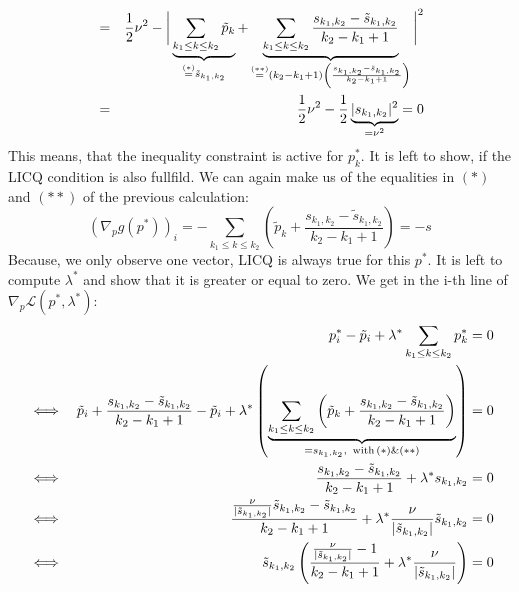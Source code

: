 \documentclass{scrreprt}
\newenvironment{proof}[1][Proof]{\begin{trivlist}
\item[\hskip \labelsep {\bfseries #1}]}{\end{trivlist}}
\begin{document}
\begin{proof}
\begin{eqnarray}
                    &=& \frac{1}{2} \nu^{2} - \bigg| \underbrace{\sum_{k_{1} \le k \le k_{2}} \tilde{p}_{k}}_{\overset{(\ast)}{=} \tilde{s}_{k_{1}, k_{2}}} + \underbrace{\sum_{k_{1} \le k \le k_{2}} \frac{s_{k_{1}, k_{2}} - \tilde{s}_{k_{1}, k_{2}}}{k_{2} - k_{1} + 1}}_{\overset{(\ast\ast)}{=} (k_{2} - k_{1} + 1) \left(\frac{s_{k_{1}, k_{2}} - \tilde{s}_{k_{1}, k_{2}}}{k_{2} - k_{1} + 1}\right)} \bigg|^{2} \notag \\
                    &=& \frac{1}{2} \nu^{2} - \frac{1}{2} \underbrace{|s_{k_{1}, k_{2}}|^{2}}_{= \nu^{2}} = 0 \notag
                \end{eqnarray}
            This means, that the inequality constraint is active for $p^{\ast}_{k}$. It is left to show, if the LICQ condition is also fullfild. We can again make us of the equalities in $(\ast)$ and $(\ast\ast)$ of the previous calculation:
                $$
                    (\nabla_{p} g(p^{\ast}))_{i} = - \sum_{k_{1} \le k \le k_{2}} \left( \tilde{p}_{k} + \frac{s_{k_{1}, k_{2}} - \tilde{s}_{k_{1}, k_{2}}}{k_{2} - k_{1} + 1} \right) = -s
                $$
            Because, we only observe one vector, LICQ is always true for this $p^{\ast}$. It is left to compute $\lambda^{\ast}$ and show that it is greater or equal to zero. We get in the i-th line of $\nabla_{p}\mathcal{L}(p^{\ast}, \lambda^{\ast})$:
                \begin{eqnarray}
                    &&p^{\ast}_{i} - \tilde{p}_{i} + \lambda^{\ast} \sum_{k_{1} \le k \le k_{2}} p^{\ast}_{k} = 0 \notag \\
                    &\iff& \tilde{p}_{i} + \frac{s_{k_{1}, k_{2}} - \tilde{s}_{k_{1}, k_{2}}}{k_{2} - k_{1} + 1} - \tilde{p}_{i} + \lambda^{\ast} \left( \underbrace{\sum_{k_{1} \le k \le k_{2}} \left( \tilde{p}_{k} + \frac{s_{k_{1}, k_{2}} - \tilde{s}_{k_{1}, k_{2}}}{k_{2} - k_{1} + 1} \right)}_{= s_{k_{1}, k_{2}}, \,\,\, \textnormal{with}\,(\ast) \& (\ast\ast)} \right) = 0 \notag \\
                    &\iff& \frac{s_{k_{1}, k_{2}} - \tilde{s}_{k_{1}, k_{2}}}{k_{2} - k_{1} + 1} + \lambda^{\ast}s_{k_{1}, k_{2}} = 0 \notag \\
                    &\iff& \frac{\frac{\nu}{|\tilde{s}_{k_{1}, k_{2}}|} \tilde{s}_{k_{1}, k_{2}} - \tilde{s}_{k_{1}, k_{2}}}{k_{2} - k_{1} + 1} + \lambda^{\ast}\frac{\nu}{|\tilde{s}_{k_{1}, k_{2}}|} \tilde{s}_{k_{1}, k_{2}} = 0 \notag \\
                    &\iff& \tilde{s}_{k_{1}, k_{2}} \left( \frac{\frac{\nu}{|\tilde{s}_{k_{1}, k_{2}}|} - 1}{k_{2} - k_{1} + 1} + \lambda^{\ast}\frac{\nu}{|\tilde{s}_{k_{1}, k_{2}}|} \right) = 0 \notag

\end{eqnarray}
\end{proof}
\end{document}
